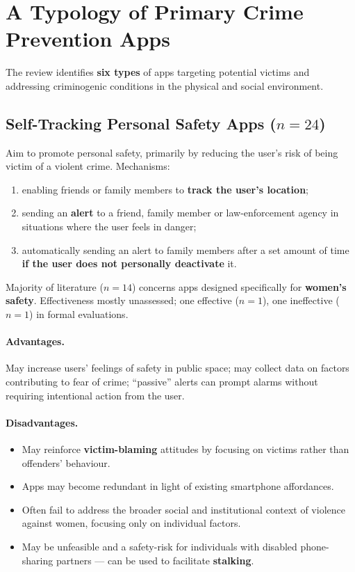 \documentclass[11pt,a4paper,openany]{report}
\theoremstyle{definition}
\theoremstyle{plain}
\theoremstyle{remark}
\begin{document}
\section{A Typology of Primary Crime Prevention Apps}

The review identifies \textbf{six types} of apps targeting potential victims and addressing criminogenic conditions in the physical and social environment.

\subsection{Self-Tracking Personal Safety Apps ($n = 24$)}

Aim to promote personal safety, primarily by reducing the user's risk of being victim of a violent crime. Mechanisms:
\begin{enumerate}
    \item enabling friends or family members to \textbf{track the user's location};
    \item sending an \textbf{alert} to a friend, family member or law-enforcement agency in situations where the user feels in danger;
    \item automatically sending an alert to family members after a set amount of time \textbf{if the user does not personally deactivate} it.
\end{enumerate}
Majority of literature ($n = 14$) concerns apps designed specifically for \textbf{women's safety}. Effectiveness mostly unassessed; one effective ($n = 1$), one ineffective ($n = 1$) in formal evaluations.

\paragraph{Advantages.} May increase users' feelings of safety in public space; may collect data on factors contributing to fear of crime; ``passive'' alerts can prompt alarms without requiring intentional action from the user.

\paragraph{Disadvantages.}
\begin{itemize}
    \item May reinforce \textbf{victim-blaming} attitudes by focusing on victims rather than offenders' behaviour.
    \item Apps may become redundant in light of existing smartphone affordances.
    \item Often fail to address the broader social and institutional context of violence against women, focusing only on individual factors.
    \item May be unfeasible and a safety-risk for individuals with disabled phone-sharing partners --- can be used to facilitate \textbf{stalking}.
\end{itemize}
\end{document}
